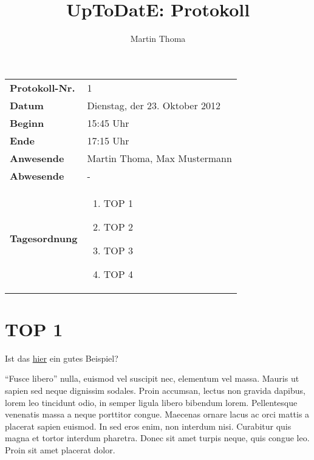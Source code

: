 \documentclass[11pt,a4paper,oneside]{scrartcl}
\newcommand\yourTitle{UpToDatE: Protokoll}
\newcommand\protokollNr{1}
\newcommand\Schriftfuehrer{Martin Thoma}
\begin{document}
 \author{\Schriftfuehrer}
 \title{\yourTitle}


\begin{center}
    \begin{tabular}{p{4.0cm} p{11.2cm}}
        \textbf{Protokoll-Nr.}      & \protokollNr\\
        \textbf{Datum}              & Dienstag, der 23. Oktober 2012\\
        \textbf{Beginn}             & 15:45 Uhr\\
        \textbf{Ende}               & 17:15 Uhr\\
        \textbf{Anwesende}          & Martin Thoma, Max Mustermann\\
        \textbf{Abwesende}          & -\\
        \textbf{Tagesordnung}       & \vspace{-7mm}%
                \begin{enumerate}[leftmargin=1.3em]%
                    \setlength{\itemsep}{-2pt}%
                    \item TOP 1
                    \item TOP 2
                    \item TOP 3
                    \item TOP 4
                \end{enumerate}
    \end{tabular}
\end{center}

\section*{TOP 1}
Ist das \href{http://www.digitale-schule-bayern.de/dsdaten/8/825.pdf}{hier}
ein gutes Beispiel?

"`Fusce libero"' nulla, euismod vel suscipit nec, elementum vel massa. 
Mauris ut sapien sed neque dignissim sodales. Proin accumsan, lectus 
non gravida dapibus, lorem leo tincidunt odio, in semper ligula 
libero bibendum lorem. Pellentesque venenatis massa a neque porttitor
congue. Maecenas ornare lacus ac orci mattis a placerat sapien 
euismod. In sed eros enim, non interdum nisi. Curabitur quis magna 
et tortor interdum pharetra. Donec sit amet turpis neque, quis congue
leo. Proin sit amet placerat dolor.
\end{document}
